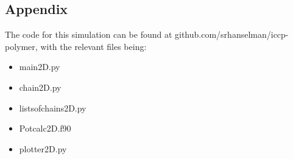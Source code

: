 \documentclass{article}
\begin{document}
\begin{multicols}{2}
\section*{Appendix}
The code for this simulation can be found at github.com/srhanselman/iccp-polymer, with the relevant files being:
\begin{itemize}
\item main2D.py
\item chain2D.py
\item listsofchains2D.py 
\item Potcalc2D.f90
\item plotter2D.py
\end{itemize}
\end{multicols}
\end{document}
